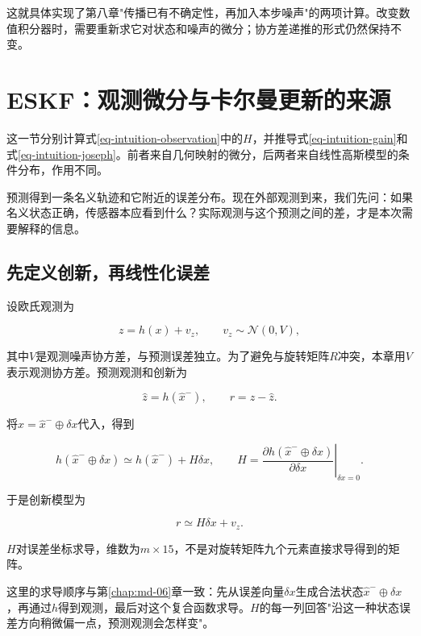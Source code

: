 这就具体实现了第八章"传播已有不确定性，再加入本步噪声"的两项计算。改变数值积分器时，需要重新求它对状态和噪声的微分；协方差递推的形式仍然保持不变。

\section{ESKF：观测微分与卡尔曼更新的来源}

这一节分别计算式\eqref{eq-intuition-observation}中的$H$，并推导式\eqref{eq-intuition-gain}和式\eqref{eq-intuition-joseph}。前者来自几何映射的微分，后两者来自线性高斯模型的条件分布，作用不同。

预测得到一条名义轨迹和它附近的误差分布。现在外部观测到来，我们先问：如果名义状态正确，传感器本应看到什么？实际观测与这个预测之间的差，才是本次需要解释的信息。

\subsection{先定义创新，再线性化误差}

设欧氏观测为

\begin{equation*}
z=h(x)+v_z,\qquad v_z\sim\mathcal N(0,V),
\end{equation*}

其中$V$是观测噪声协方差，与预测误差独立。为了避免与旋转矩阵$R$冲突，本章用$V$表示观测协方差。预测观测和创新为

\begin{equation*}
\hat z=h(\hat x^-),\qquad r=z-\hat z.
\end{equation*}

将$x=\hat x^-\oplus\delta x$代入，得到

\begin{equation*}
h(\hat x^-\oplus\delta x)
 \simeq h(\hat x^-)+H\delta x,
 \qquad
 H=\left.\frac{\partial h(\hat x^-\oplus\delta x)}{\partial\delta x}
   \right|_{\delta x=0}.
\end{equation*}

于是创新模型为

\begin{equation*}
\boxed{r\simeq H\delta x+v_z.}
\end{equation*}

$H$对误差坐标求导，维数为$m\times15$，不是对旋转矩阵九个元素直接求导得到的矩阵。

这里的求导顺序与第\ref{chap:md-06}章一致：先从误差向量$\delta x$生成合法状态$\hat x^-\oplus\delta x$，再通过$h$得到观测，最后对这个复合函数求导。$H$的每一列回答"沿这一种状态误差方向稍微偏一点，预测观测会怎样变"。

